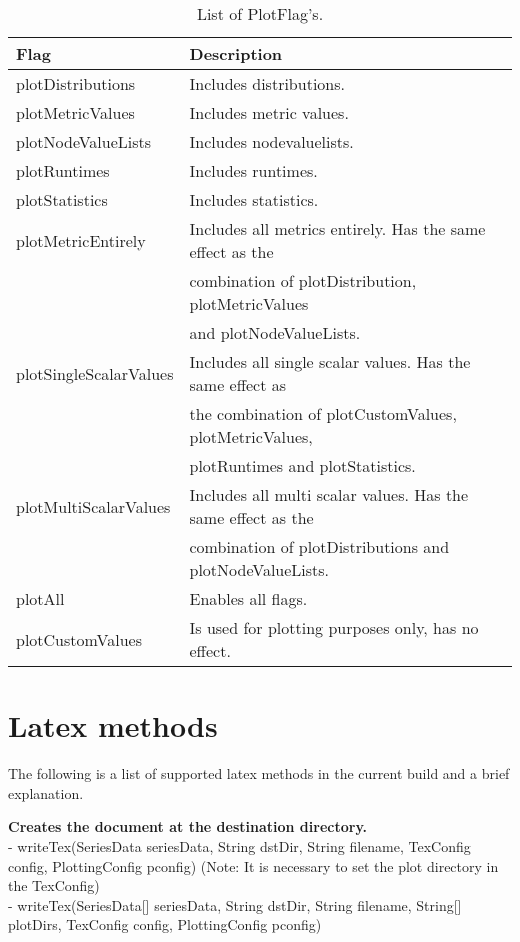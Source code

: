 \begin{table}[h]
\centering
\begin{tabular}[h]{|l|l|}\hline
	\textbf{Flag} & \textbf{Description}\\
	\hline
	plotDistributions & Includes distributions.\\
	\hline
	plotMetricValues & Includes metric values.\\
	\hline
	plotNodeValueLists & Includes nodevaluelists.\\
	\hline
	plotRuntimes & Includes runtimes.\\
	\hline
	plotStatistics & Includes statistics.\\
	\hline
	plotMetricEntirely & Includes all metrics entirely. Has the same effect as the\\
	& combination of plotDistribution, plotMetricValues\\
	& and plotNodeValueLists. \\
	\hline
	plotSingleScalarValues & Includes all single scalar values. Has the same effect as\\
	& the combination of plotCustomValues, plotMetricValues,\\
	& plotRuntimes and plotStatistics.\\
	\hline
	plotMultiScalarValues & Includes all multi scalar values. Has the same effect as the\\
	& combination of plotDistributions and plotNodeValueLists.\\
	\hline
	plotAll & Enables all flags.\\
	\hline
	plotCustomValues & Is used for plotting purposes only, has no effect.\\
	\hline
\end{tabular}
\caption{List of PlotFlag's.}
\label{tab:plot-flags}
\end{table}

\section{Latex methods}
\label{sec:methods}
The following is a list of supported latex methods in the current build and a brief explanation.

\textbf{Creates the document at the destination directory.}\\
- writeTex(SeriesData seriesData, String dstDir, String filename, TexConfig config, PlottingConfig pconfig) (Note: It is necessary to set the plot directory in the TexConfig)\\
- writeTex(SeriesData[] seriesData, String dstDir, String filename, String[] plotDirs, TexConfig config, PlottingConfig pconfig)


